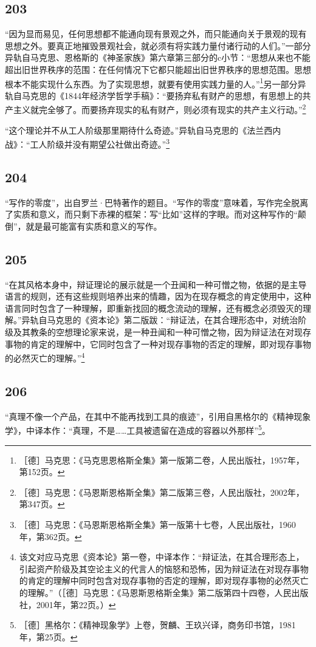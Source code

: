 \documentclass[fontset=fandol, a4paper, 12pt, openright]{ctexbook}
\begin{document}
\subsection*{203}
“因为显而易见，任何思想都不能通向现有景观之外，而只能通向关于景观的现有思想之外。要真正地摧毁景观社会，就必须有将实践力量付诸行动的人们。”一部分异轨自马克思、恩格斯的《神圣家族》第六章第三部分的c小节：“思想从来也不能超出旧世界秩序的范围：在任何情况下它都只能超出旧世界秩序的思想范围。思想根本不能实现什么东西。为了实现思想，就要有使用实践力量的人。”\footnote{［德］马克思：《马克思恩格斯全集》第一版第二卷，人民出版社，1957年，第152页。}另一部分异轨自马克思的《1844年经济学哲学手稿》：“要扬弃私有财产的思想，有思想上的共产主义就完全够了。而要扬弃现实的私有财产，则必须有现实的共产主义行动。”\footnote{［德］马克思：《马恩斯恩格斯全集》第二版第三卷，人民出版社，2002年，第347页。}

“这个理论并不从工人阶级那里期待什么奇迹。”异轨自马克思的《法兰西内战》：“工人阶级并没有期望公社做出奇迹。”\footnote{［德］马克思：《马恩斯恩格斯全集》第一版第十七卷，人民出版社，1960年，第362页。}

\subsection*{204}
“写作的零度”，出自罗兰·巴特著作的题目。“写作的零度”意味着，写作完全脱离了实质和意义，而只剩下赤裸的框架：写“比如”这样的字眼。而对这种写作的“颠倒”，就是最可能富有实质和意义的写作。

\subsection*{205}
“在其风格本身中，辩证理论的展示就是一个丑闻和一种可憎之物，依据的是主导语言的规则，还有这些规则培养出来的情趣，因为在现存概念的肯定使用中，这种语言同时包含了一种理解，即重新找回的概念流动的理解，还有概念必须毁灭的理解。”异轨自马克思的《资本论》第二版跋：“辩证法，在其合理形态中，对统治阶级及其教条的空想理论家来说，是一种丑闻和一种可憎之物，因为辩证法在对现存事物的肯定的理解中，它同时包含了一种对现存事物的否定的理解，即对现存事物的必然灭亡的理解。”\footnote{该文对应马克思《资本论》第一卷，中译本作：“辩证法，在其合理形态上，引起资产阶级及其空论主义的代言人的恼怒和恐怖，因为辩证法在对现存事物的肯定的理解中同时包含对现存事物的否定的理解，即对现存事物的必然灭亡的理解。”（［德］马克思：《马恩斯恩格斯全集》第二版第四十四卷，人民出版社，2001年，第22页。）}

\subsection*{206}
“真理不像一个产品，在其中不能再找到工具的痕迹”，引用自黑格尔的《精神现象学》，中译本作：“真理，不是……工具被遗留在造成的容器以外那样”\footnote{［德］黑格尔：《精神现象学》上卷，贺麟、王玖兴译，商务印书馆，1981年，第25页。}。
\end{document}

